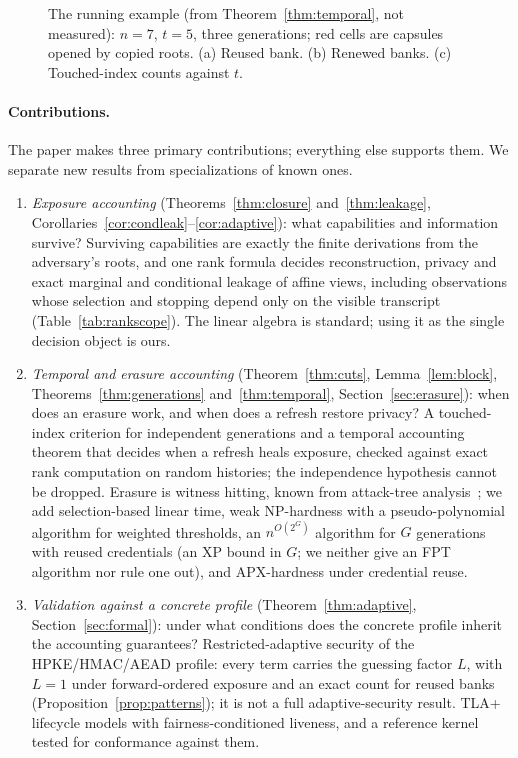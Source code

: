 \documentclass[pdflatex,sn-mathphys-num]{sn-jnl}%
\theoremstyle{plain}
\theoremstyle{definition}
\begin{document}
\begin{figure}[t]
\centering
\figbox{}
\caption{The running example (from Theorem~\ref{thm:temporal}, not measured): $n=7$, $t=5$, three generations; red cells are capsules opened by copied roots. (a) Reused bank. (b) Renewed banks. (c) Touched-index counts against $t$.}\label{fig:worked}
\end{figure}

\paragraph{Contributions.}
The paper makes three primary contributions; everything else supports them. We separate new results from specializations of known ones.
\begin{enumerate}
\item \emph{Exposure accounting} (Theorems~\ref{thm:closure} and~\ref{thm:leakage}, Corollaries~\ref{cor:condleak}--\ref{cor:adaptive}): what capabilities and information survive? Surviving capabilities are exactly the finite derivations from the adversary's roots, and one rank formula decides reconstruction, privacy and exact marginal and conditional leakage of affine views, including observations whose selection and stopping depend only on the visible transcript (Table~\ref{tab:rankscope}). The linear algebra is standard; using it as the single decision object is ours.
\item \emph{Temporal and erasure accounting} (Theorem~\ref{thm:cuts}, Lemma~\ref{lem:block}, Theorems~\ref{thm:generations} and~\ref{thm:temporal}, Section~\ref{sec:erasure}): when does an erasure work, and when does a refresh restore privacy? A touched-index criterion for independent generations and a temporal accounting theorem that decides when a refresh heals exposure, checked against exact rank computation on random histories; the independence hypothesis cannot be dropped. Erasure is witness hitting, known from attack-tree analysis~\cite{mauw2005,lopuhaa2022}; we add selection-based linear time, weak NP-hardness with a pseudo-polynomial algorithm for weighted thresholds, an $n^{O(2^G)}$ algorithm for $G$ generations with reused credentials (an XP bound in $G$; we neither give an FPT algorithm nor rule one out), and APX-hardness under credential reuse.
\item \emph{Validation against a concrete profile} (Theorem~\ref{thm:adaptive}, Section~\ref{sec:formal}): under what conditions does the concrete profile inherit the accounting guarantees? Restricted-adaptive security of the HPKE/HMAC/AEAD profile: every term carries the guessing factor $L$, with $L=1$ under forward-ordered exposure and an exact count for reused banks (Proposition~\ref{prop:patterns}); it is not a full adaptive-security result. TLA+ lifecycle models with fairness-conditioned liveness, and a reference kernel tested for conformance against them.
\end{enumerate}
\end{document}
